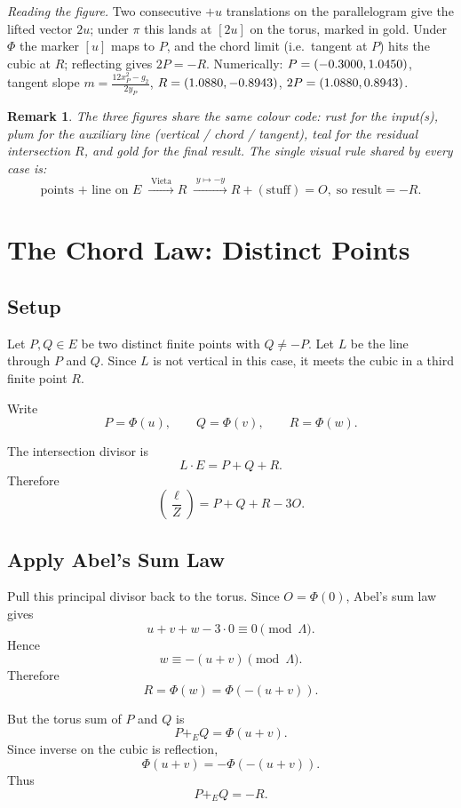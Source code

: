 \documentclass[11pt]{article}
\newtheorem*{remark}{Remark}
\begin{document}
\noindent\textit{Reading the figure.} Two consecutive \(+u\) translations on
the parallelogram give the lifted vector \(2u\); under \(\pi\) this lands at
\([2u]\) on the torus, marked in gold.  Under \(\Phi\) the marker \([u]\)
maps to \(P\), and the chord limit (i.e.\ tangent at \(P\)) hits the cubic
at \(R\); reflecting gives \(2P=-R\).  Numerically:
\(P=(-0.3000,1.0450)\), tangent slope
\(m=\tfrac{12x_P^2-g_2}{2y_P}\),
\(R=(1.0880,-0.8943)\),
\(2P=(1.0880,0.8943)\).

\begin{remark}
The three figures share the same colour code: rust for the input(s), plum
for the auxiliary line (vertical / chord / tangent), teal for the residual
intersection \(R\), and gold for the final result.  The single visual rule
shared by every case is:
\[
\boxed{\;
\text{points + line on }E\;\xrightarrow{\;\text{Vieta}\;} R
\;\xrightarrow{\;y\mapsto-y\;} R+(\text{stuff})=O,
\;\text{so result}=-R.
\;}
\]
\end{remark}

\section{The Chord Law: Distinct Points}

\subsection{Setup}

Let \(P,Q\in E\) be two distinct finite points with \(Q\neq -P\).  Let \(L\)
be the line through \(P\) and \(Q\).  Since \(L\) is not vertical in this
case, it meets the cubic in a third finite point \(R\).

Write
\[
P=\Phi(u),\qquad Q=\Phi(v),\qquad R=\Phi(w).
\]

The intersection divisor is
\[
L\cdot E=P+Q+R.
\]
Therefore
\[
\left(\frac{\ell}{Z}\right)=P+Q+R-3O.
\]

\subsection{Apply Abel's Sum Law}

Pull this principal divisor back to the torus.  Since \(O=\Phi(0)\), Abel's
sum law gives
\[
u+v+w-3\cdot0\equiv0\pmod{\Lambda}.
\]
Hence
\[
w\equiv-(u+v)\pmod{\Lambda}.
\]
Therefore
\[
R=\Phi(w)=\Phi(-(u+v)).
\]

But the torus sum of \(P\) and \(Q\) is
\[
P+_E Q=\Phi(u+v).
\]
Since inverse on the cubic is reflection,
\[
\Phi(u+v)=-\Phi(-(u+v)).
\]
Thus
\[
\boxed{
P+_E Q=-R.
}
\]
\end{document}
